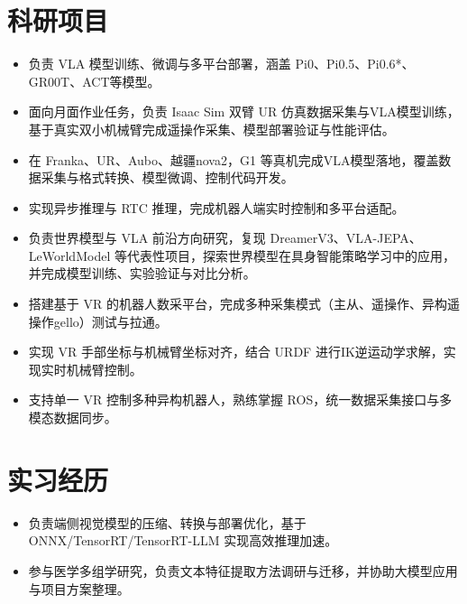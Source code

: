 \documentclass{resume}
\begin{document}
\section{科研项目}
\begin{itemize}
  \item 负责 VLA 模型训练、微调与多平台部署，涵盖 Pi0、Pi0.5、Pi0.6*、GR00T、ACT等模型。
  \item 面向月面作业任务，负责 Isaac Sim 双臂 UR 仿真数据采集与VLA模型训练，基于真实双小机械臂完成遥操作采集、模型部署验证与性能评估。
  \item 在 Franka、UR、Aubo、越疆nova2，G1 等真机完成VLA模型落地，覆盖数据采集与格式转换、模型微调、控制代码开发。
  \item 实现异步推理与 RTC 推理，完成机器人端实时控制和多平台适配。
\end{itemize}

\begin{itemize}
  \item 负责世界模型与 VLA 前沿方向研究，复现 DreamerV3、VLA-JEPA、LeWorldModel 等代表性项目，探索世界模型在具身智能策略学习中的应用，并完成模型训练、实验验证与对比分析。
  \item 搭建基于 VR 的机器人数采平台，完成多种采集模式（主从、遥操作、异构遥操作gello）测试与拉通。
  \item 实现 VR 手部坐标与机械臂坐标对齐，结合 URDF 进行IK逆运动学求解，实现实时机械臂控制。
  \item 支持单一 VR 控制多种异构机器人，熟练掌握 ROS，统一数据采集接口与多模态数据同步。
\end{itemize}

\section{实习经历}
\begin{itemize}
  \item 负责端侧视觉模型的压缩、转换与部署优化，基于 ONNX/TensorRT/TensorRT-LLM 实现高效推理加速。
\end{itemize}

\begin{itemize}
  \item 参与医学多组学研究，负责文本特征提取方法调研与迁移，并协助大模型应用与项目方案整理。
\end{itemize}
\end{document}
